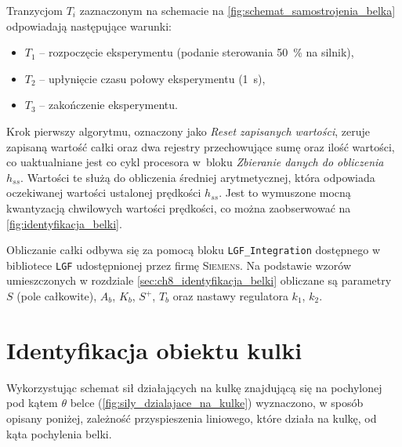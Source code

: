 Tranzycjom $T_i$ zaznaczonym na schemacie na \cref{fig:schemat_samostrojenia_belka} odpowiadają następujące warunki:
\begin{itemize}
    \item $T_1$ -- rozpoczęcie eksperymentu (podanie sterowania \SI{50}{\percent} na silnik),
    \item $T_2$ -- upłynięcie czasu połowy eksperymentu (\SI{1}{\second}),
    \item $T_3$ -- zakończenie eksperymentu.
\end{itemize}

Krok pierwszy algorytmu, oznaczony jako \textit{Reset zapisanych wartości}, zeruje zapisaną wartość całki oraz dwa rejestry przechowujące sumę oraz ilość wartości, co uaktualniane jest co cykl procesora w~bloku \textit{Zbieranie danych do obliczenia $h_{ss}$}. Wartości te służą do obliczenia średniej arytmetycznej, która odpowiada oczekiwanej wartości ustalonej prędkości $h_{ss}$. Jest to wymuszone mocną kwantyzacją chwilowych wartości prędkości, co można zaobserwować na \cref{fig:identyfikacja_belki}.

Obliczanie całki odbywa się za pomocą bloku \texttt{LGF\_Integration}\cite{LGF} dostępnego w bibliotece \texttt{LGF} udostępnionej przez firmę \textsc{Siemens}. Na podstawie wzorów umieszczonych w rozdziale \ref{sec:ch8_identyfikacja_belki} obliczane są parametry $S$ (pole całkowite), $A_b$, $K_b$, $S^+$, $T_b$ oraz nastawy regulatora $k_1$, $k_2$.

\section{Identyfikacja obiektu kulki}
\label{sec:ch8_identyfikacja_kulki}

Wykorzystując schemat sił działających na kulkę znajdującą się na pochylonej pod kątem $\theta$ belce (\cref{fig:sily_dzialajace_na_kulke}) wyznaczono, w sposób opisany poniżej, zależność przyspieszenia liniowego, które działa na kulkę, od kąta pochylenia belki.

\def\iangle{6} %
\def\arcr{1.1cm} %
\def\down{-90}

